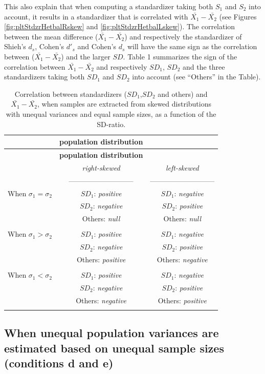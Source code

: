 \documentclass[
  man]{apa6}
\begin{document}
This also explain that when computing a standardizer taking both \(S_1\) and \(S_2\) into account, it results in a standardizer that is correlated with \(\bar{X_1}-\bar{X_2}\) (see Figures \ref{fig:pltStdzrHetbalRskew} and \ref{fig:pltStdzrHetbalLskew}). The correlation between the mean difference (\(\bar{X_1}-\bar{X_2}\)) and respectively the standardizer of Shieh's \(d_s\), Cohen's \(d'_s\) and Cohen's \(d_s\) will have the same sign as the correlation between (\(\bar{X_1}-\bar{X_2}\)) and the larger \(SD\). Table 1 summarizes the sign of the correlation between \(\bar{X_1}-\bar{X_2}\) and respectively \(SD_1\), \(SD_2\) and the three standardizers taking both \(SD_1\) and \(SD_2\) into account (see \enquote{Others} in the Table).

\begin{longtable}[]{@{}lcc@{}}
\caption{Correlation between standardizers (\(SD_1\),\(SD_2\) and others) and \(\bar{X_1}-\bar{X_2}\), when samples are extracted from skewed distributions with unequal variances and equal sample sizes, as a function of the SD-ratio.}\tabularnewline
\toprule
& \textbf{\textbf{population distribution}} &\tabularnewline
\midrule
\endfirsthead
\toprule
& \textbf{\textbf{population distribution}} &\tabularnewline
\midrule
\endhead
& \emph{right-skewed} & \emph{left-skewed}\tabularnewline
& --------------------------- & ---------------------------\tabularnewline
When \(\sigma_1=\sigma_2\) & \(SD_1\): \emph{positive} & \(SD_1\): \emph{negative}\tabularnewline
& \(SD_2\): \emph{negative} & \(SD_2\): \emph{positive}\tabularnewline
& Others: \emph{null} & Others: \emph{null}\tabularnewline
& &\tabularnewline
When \(\sigma_1>\sigma_2\) & \(SD_1\): \emph{positive} & \(SD_1\): \emph{negative}\tabularnewline
& \(SD_2\): \emph{negative} & \(SD_2\): \emph{positive}\tabularnewline
& Others: \emph{positive} & Others: \emph{negative}\tabularnewline
& &\tabularnewline
When \(\sigma_1<\sigma_2\) & \(SD_1\): \emph{positive} & \(SD_1\): \emph{negative}\tabularnewline
& \(SD_2\): \emph{negative} & \(SD_2\): \emph{positive}\tabularnewline
& Others: \emph{negative} & Others: \emph{positive}\tabularnewline
& &\tabularnewline
\bottomrule
\end{longtable}

\hypertarget{when-unequal-population-variances-are-estimated-based-on-unequal-sample-sizes-conditions-d-and-e}{%
\subsection{When unequal population variances are estimated based on unequal sample sizes (conditions d and e)}\label{when-unequal-population-variances-are-estimated-based-on-unequal-sample-sizes-conditions-d-and-e}}
\end{document}

